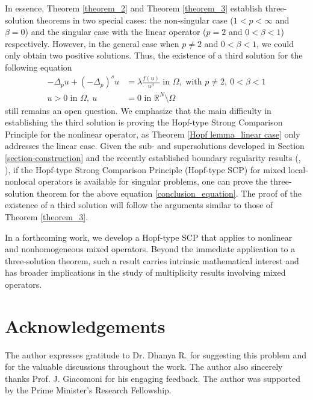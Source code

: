 \documentclass[reqno,oneside]{amsart}
\theoremstyle{definition}
\theoremstyle{remark}
\numberwithin{equation}{section}
\newcommand{\p}{\Delta_p}
\newcommand{\ps}{(-\Delta_p)^s}
\newcommand{\la} {\lambda}
\newcommand{\ba}{\beta}
\newcommand{\Om} {\Omega}
\newcommand{\bdry}{\mathbb{R}^N \setminus \Omega}
\begin{document}
In essence, Theorem \ref{theorem_2} and Theorem \ref{theorem_3} establish three-solution theorems in two special cases: the non-singular case ($1<p<\infty$ and $\ba =0$) and the singular case with the linear operator ($p=2$ and $0<\ba <1$) respectively. However, in the general case when $p\not= 2$ and $0<\ba<1$, we could only obtain two positive solutions. Thus, the existence of a third solution for the following equation
\begin{equation}\label{conclusion_equation}
    \begin{aligned}
        -\p u + \ps u &= \la \frac{f(u)}{u^{\ba}} \text{ in } \Om, \text{ with } p\not= 2,\ 0<\beta<1 \\
        u >0 \text{ in } \Om,\ u &=0 \text{ in } \bdry
    \end{aligned}
\end{equation}
still remains an open question. We emphasize that the main difficulty in establishing the third solution is proving the Hopf-type Strong Comparison Principle for the nonlinear operator, as Theorem \ref{Hopf lemma_linear case} only addresses the linear case. Given the sub- and supersolutions developed in Section \ref{section-construction} and the recently established boundary regularity results (\cite{dhanya2024interiorboundaryregularitymixed}, \cite{bal2025regularityresultsclassmixed}), if the Hopf-type Strong Comparison Principle (Hopf-type SCP) for mixed local-nonlocal operators is available for singular problems, one can prove the three-solution theorem for the above equation \eqref{conclusion_equation}. The proof of the existence of a third solution will follow the arguments similar to those of Theorem \ref{theorem_3}.

In a forthcoming work, we develop a Hopf-type SCP that applies to nonlinear and nonhomogeneous mixed operators. Beyond the immediate application to a three-solution theorem, such a result carries intrinsic mathematical interest and has broader implications in the study of multiplicity results involving mixed operators.


\section*{Acknowledgements}

The author expresses gratitude to Dr. Dhanya R. for suggesting this problem and for the valuable discussions throughout the work. The author also sincerely thanks Prof. J. Giacomoni for his engaging feedback. The author was supported by the Prime Minister's Research Fellowship.



	
\end{document}
